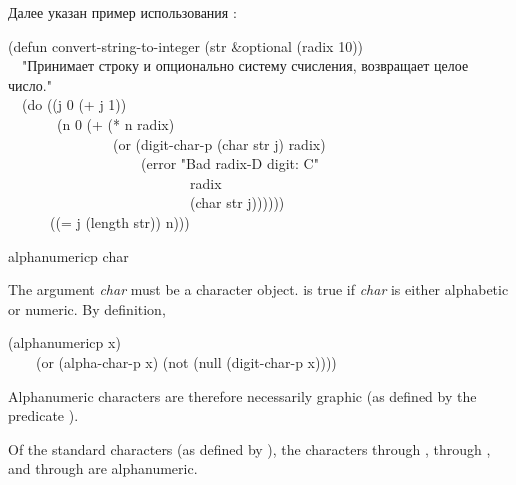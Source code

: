 \begin{defun}[Function]
Далее указан пример использования :
\begin{lisp}
(defun convert-string-to-integer (str \&optional (radix 10)) \\
~~"Принимает строку и опционально систему счисления, возвращает целое число." \\
~~(do ((j 0 (+ j 1)) \\
~~~~~~~(n 0 (+ (* n radix) \\
~~~~~~~~~~~~~~~(or (digit-char-p (char str j) radix) \\
~~~~~~~~~~~~~~~~~~~(error "Bad radix-{\Xtilde}D digit: {\Xtilde}C" \\
~~~~~~~~~~~~~~~~~~~~~~~~~~radix \\
~~~~~~~~~~~~~~~~~~~~~~~~~~(char str j)))))) \\
~~~~~~((= j (length str)) n)))
\end{lisp}
\end{defun}

\begin{defun}[Function]
alphanumericp char

The argument \emph{char} must be a character object.
 is true if \emph{char} is either alphabetic
or numeric.  By definition,
\begin{lisp}
(alphanumericp x) \\
~~~\EQ\ (or (alpha-char-p x) (not (null (digit-char-p x))))
\end{lisp}
Alphanumeric characters are therefore necessarily graphic
(as defined by the predicate ).

Of the standard characters (as defined by ),
the characters  through ,  through ,
and  through  are alphanumeric.
\end{defun}


